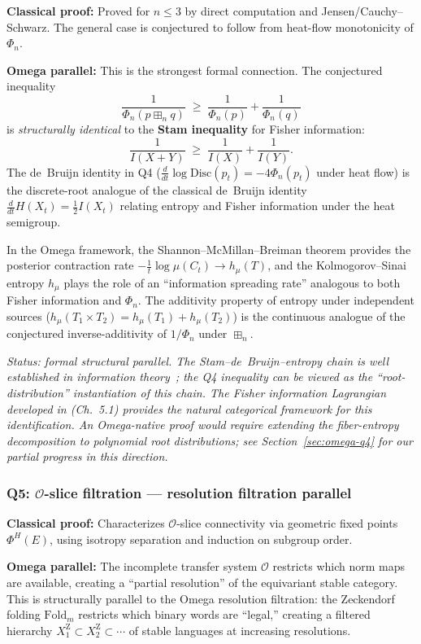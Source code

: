 \noindent\textbf{Classical proof:} Proved for $n\le 3$ by direct computation
and Jensen/Cauchy--Schwarz.  The general case is conjectured to follow from
heat-flow monotonicity of $\Phi_n$.

\noindent\textbf{Omega parallel:}
This is the strongest formal connection.  The conjectured inequality
\[
\frac{1}{\Phi_n(p\boxplus_n q)}
\;\ge\;
\frac{1}{\Phi_n(p)}+\frac{1}{\Phi_n(q)}
\]
is \emph{structurally identical} to the \textbf{Stam inequality} for
Fisher information:
\[
\frac{1}{I(X+Y)}
\;\ge\;
\frac{1}{I(X)}+\frac{1}{I(Y)}.
\]
The de~Bruijn identity in Q4
($\tfrac{d}{dt}\log\mathrm{Disc}(p_t)=-4\Phi_n(p_t)$ under heat flow)
is the discrete-root analogue of the classical de~Bruijn identity
$\tfrac{d}{dt}H(X_t)=\tfrac12 I(X_t)$ relating entropy and Fisher
information under the heat semigroup.

In the Omega framework, the Shannon--McMillan--Breiman theorem provides
the posterior contraction rate
$-\tfrac{1}{t}\log\mu(C_t)\to h_\mu(T)$,
and the Kolmogorov--Sinai entropy $h_\mu$ plays the role of an
``information spreading rate'' analogous to both Fisher information
and $\Phi_n$.  The additivity property of entropy under independent
sources ($h_\mu(T_1\times T_2)=h_\mu(T_1)+h_\mu(T_2)$) is the
continuous analogue of the conjectured inverse-additivity of $1/\Phi_n$
under $\boxplus_n$.

\emph{Status: formal structural parallel.  The Stam--de~Bruijn--entropy
chain is well established in information theory~\cite{stam1959,costa1985};
the Q4 inequality can be viewed as the ``root-distribution'' instantiation
of this chain.  The Fisher information Lagrangian developed in
\cite{omega-theory} (Ch.~5.1) provides the natural categorical framework
for this identification.  An Omega-native proof would require extending
the fiber-entropy decomposition to polynomial root distributions; see
Section~\ref{sec:omega-q4} for our partial progress in this direction.}


\subsubsection*{Q5: $\mathcal O$-slice filtration ---
  resolution filtration parallel}

\noindent\textbf{Classical proof:} Characterizes $\mathcal O$-slice
connectivity via geometric fixed points $\Phi^H(E)$, using isotropy
separation and induction on subgroup order.

\noindent\textbf{Omega parallel:}
The incomplete transfer system $\mathcal O$ restricts which norm maps
are available, creating a ``partial resolution'' of the equivariant
stable category.  This is structurally parallel to the Omega resolution
filtration: the Zeckendorf folding $\mathrm{Fold}_m$ restricts which
binary words are ``legal,'' creating a filtered hierarchy
$X^{\mathrm Z}_1\subset X^{\mathrm Z}_2\subset\cdots$ of stable
languages at increasing resolutions.

